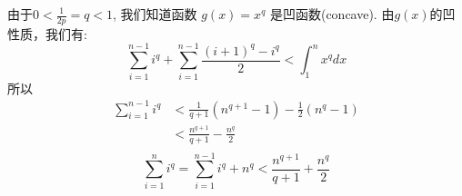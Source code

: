  由于$0<\frac{1}{2p}=q<1$, 我们知道函数 $g(x)=x^q$ 是凹函数(concave). 由$g(x)$的凹性质，我们有:
 \begin{equation}
 \sum_{i=1}^{n-1}i^q+\sum_{i=1}^{n-1}\frac{(i+1)^q-i^q}{2}<\int_1^{n}x^qdx
 \end{equation}
 所以
 \begin{equation}
 \begin{split}
 \sum_{i=1}^{n-1}i^q
 &<\frac{1}{q+1}(n^{q+1}-1)-\frac{1}{2}(n^q-1)\\
 &<\frac{n^{q+1}}{q+1}-\frac{n^q}{2}\\
 \end{split}
 \end{equation}
 \begin{equation}
 \sum_{i=1}^{n}i^q=\sum_{i=1}^{n-1}i^q+n^q<\frac{n^{q+1}}{q+1}+\frac{n^q}{2}
 \end{equation}

